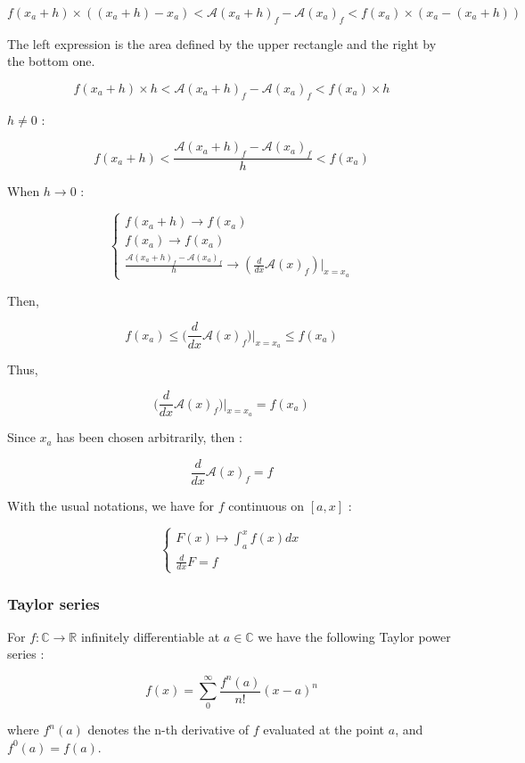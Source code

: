 \documentclass[12pt]{article}
\begin{document}
$$ 
f(x_a +h) \times ( (x_a+h)-x_a) < \mathcal{A}(x_a+h)_f - \mathcal{A}(x_a)_f < f(x_a) \times ( x_a-(x_a+h))
$$

The left expression is the area defined by the upper rectangle and the right by the bottom one.

$$ 
f(x_a +h) \times h < \mathcal{A}(x_a+h)_f - \mathcal{A}(x_a)_f < f(x_a) \times h
$$

$h \neq 0$ :

$$ 
f(x_a +h) < \frac{\mathcal{A}(x_a+h)_f - \mathcal{A}(x_a)_f}{h} < f(x_a)
$$

When $h \rightarrow 0$ :

$$
\begin{cases}
f(x_a +h) \rightarrow f(x_a) \\
f(x_a) \rightarrow f(x_a) \\
\frac{\mathcal{A}(x_a+h)_f - \mathcal{A}(x_a)_f}{h} \rightarrow (\frac{d}{dx} \mathcal{A}(x)_f)|_{x=x_a}
\end{cases}
$$

Then,

$$ 
f(x_a) \leq  \big( \frac{d}{dx} \mathcal{A}(x)_f \big)|_{x=x_a} \leq f(x_a)
$$

Thus,

$$
\big( \frac{d}{dx} \mathcal{A}(x)_f \big)|_{x=x_a} = f(x_a)
$$

Since $x_a$ has been chosen arbitrarily, then :

$$
\frac{d}{dx} \mathcal{A}(x)_f = f
$$

With the usual notations, we have for $f$ continuous on $[a, x]$ :

$$
\begin{cases}
F(x) \mapsto \int_a^x f(x)dx \\
\frac{d}{dx}F = f
\end{cases}
$$

\subsubsection{Taylor series}

For $f: \mathbb{C} \rightarrow \mathbb{R}$ infinitely differentiable at $a \in \mathbb{C}$ we have the following Taylor power series :

$$
f(x) = \sum_0^\infty  \frac{f^n(a)}{n!} (x-a)^n 
$$

where $f^n(a)$ denotes the n-th derivative of $f$ evaluated at the point $a$, and $f^0(a)=f(a)$.
\end{document}
